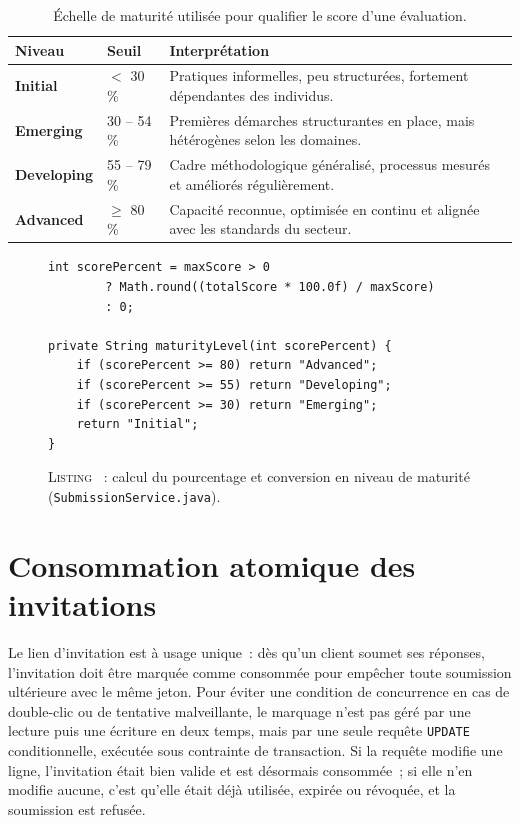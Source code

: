 \documentclass[12pt,a4paper]{report}
\begin{document}
\begin{table}[H]
\centering
\caption{Échelle de maturité utilisée pour qualifier le score d'une évaluation.}
\label{tab:maturity-scale}
\begin{tabularx}{\textwidth}{>{\bfseries}L{3.0cm}L{2.0cm}Y}
\toprule
Niveau & Seuil & Interprétation \\
\midrule
Initial    & $<$ 30\,\%    & Pratiques informelles, peu structurées, fortement dépendantes des individus. \\
Emerging   & 30 -- 54\,\%  & Premières démarches structurantes en place, mais hétérogènes selon les domaines. \\
Developing & 55 -- 79\,\%  & Cadre méthodologique généralisé, processus mesurés et améliorés régulièrement. \\
Advanced   & $\geq$ 80\,\% & Capacité reconnue, optimisée en continu et alignée avec les standards du secteur. \\
\bottomrule
\end{tabularx}
\end{table}

\begin{figure}[H]
\centering
\begin{minipage}{0.85\textwidth}
\begin{verbatim}
int scorePercent = maxScore > 0
        ? Math.round((totalScore * 100.0f) / maxScore)
        : 0;

private String maturityLevel(int scorePercent) {
    if (scorePercent >= 80) return "Advanced";
    if (scorePercent >= 55) return "Developing";
    if (scorePercent >= 30) return "Emerging";
    return "Initial";
}
\end{verbatim}
\end{minipage}
\label{lst:maturity}
\caption*{\textsc{Listing \thefigure}~: calcul du pourcentage et conversion en niveau de maturité (\texttt{SubmissionService.java}).}
\end{figure}

\section{Consommation atomique des invitations}
Le lien d'invitation est à usage unique~: dès qu'un client soumet ses réponses, l'invitation doit être marquée comme consommée pour empêcher toute soumission ultérieure avec le même jeton. Pour éviter une condition de concurrence en cas de double-clic ou de tentative malveillante, le marquage n'est pas géré par une lecture puis une écriture en deux temps, mais par une seule requête \texttt{UPDATE} conditionnelle, exécutée sous contrainte de transaction. Si la requête modifie une ligne, l'invitation était bien valide et est désormais consommée~; si elle n'en modifie aucune, c'est qu'elle était déjà utilisée, expirée ou révoquée, et la soumission est refusée.
\end{document}
